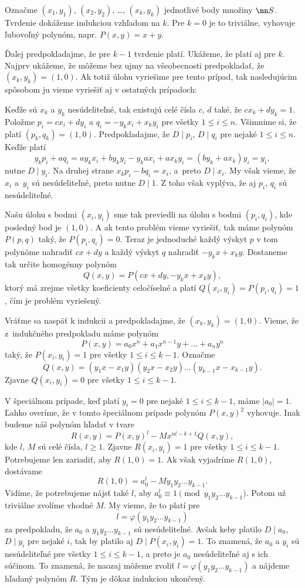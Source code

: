 {%
Označme $(x_1,y_1)$, $(x_2,y_2)$, \dots, $(x_k,y_k)$ jednotlivé body množiny $\mn S$. Tvrdenie dokážeme indukciou vzhľadom na $k$. Pre $k=0$ je to triviálne, vyhovuje ľubovoľný polynóm, napr. $P(x,y)=x+y$.

Ďalej predpokladajme, že pre $k-1$ tvrdenie platí. Ukážeme, že platí aj pre $k$. Najprv ukážeme, že môžeme bez ujmy na všeobecnosti predpokladať, že $(x_k,y_k)=(1,0)$. Ak totiž úlohu vyriešime pre tento prípad, tak nasledujúcim spôsobom ju vieme vyriešiť aj v ostatných prípadoch:

Keďže sú $x_k$ a $y_k$ nesúdeliteľné, tak existujú celé čísla $c$, $d$ také, že $cx_k+dy_k=1$. Položme $p_i=cx_i+dy_i$ a $q_i=-y_kx_i+x_ky_i$ pre všetky $1\le i\le n$. Všimnime si, že platí $(p_k,q_k)=(1,0)$. Predpokladajme, že $D\mid p_i$, $D\mid q_i$ pre nejaké $1\le i\le n$. Keďže platí
$$
y_kp_i+aq_i=ay_kx_i+by_ky_i-y_kax_i+ax_ky_i=(by_k+ax_k)y_i=y_i,
$$
nutne $D\mid y_i$. Na druhej strane $x_kp_i-bq_i=x_i$, a~preto $D\mid x_i$. My však vieme, že $x_i$ a~$y_i$ sú nesúdeliteľné, preto nutne $D\mid 1$. Z toho však vyplýva, že aj $p_i$, $q_i$ sú nesúdeliteľné.

Našu úlohu s bodmi $(x_i,y_i)$ sme tak previedli na úlohu s bodmi $(p_i,q_i)$, kde posledný bod je $(1,0)$. A ak tento problém vieme vyriešiť, tak máme polynóm $P(p,q)$ taký, že $P(p_i,q_i)=0$. Teraz je jednoduché každý výskyt $p$ v tom polynóme nahradiť $cx+dy$ a každý výskyt $q$ nahradiť $-y_kx+x_ky$. Dostaneme tak určite homogénny polynóm $$Q(x,y)=P(cx+dy,-y_kx+x_ky),$$ ktorý má zrejme všetky koeficienty celočíselné a platí $Q(x_i,y_i)=P(p_i,q_i)=1$, čím je problém vyriešený.

Vráťme sa naspäť k indukcii a predpokladajme, že $(x_k,y_k)=(1,0)$.
Vieme, že z~indukčného predpokladu máme polynóm $$P(x,y)=a_0x^n+a_1x^{n-1}y+\dots+a_ny^n$$ taký, že $P(x_i,y_i)=1$ pre všetky $1\le i\le k-1$. Označme $$Q(x,y)=(y_1x-x_1y)(y_2x-x_2y)\dots(y_{k-1}x-x_{k-1}y).$$ Zjavne $Q(x_i,y_i)=0$ pre všetky $1\le i\le k-1$.

V špeciálnom prípade, keď platí $y_i=0$ pre nejaké $1\le i\le k-1$, máme $|a_0|=1$. Ľahko overíme, že v tomto špeciálnom prípade polynóm $P(x,y)^2$ vyhovuje. Inak budeme náš polynóm hľadať v tvare $$R(x,y)=P(x,y)^l-Mx^{nl-k+1}Q(x,y),$$ kde $l$, $M$ sú celé čísla, $l\ge 1$. Zjavne $R(x_i,y_i)=1$ pre všetky $1\le i\le k-1$. Potrebujeme len zariadiť, aby $R(1,0)=1$. Ak však vyjadríme $R(1,0)$, dostávame $$R(1,0)=a_0^l-My_1y_2\dots y_{k-1}.$$
Vidíme, že potrebujeme nájsť také $l$, aby $a_0^l\equiv 1\pmod{y_1y_2\dots y_{k-1}}$. Potom už triviálne zvolíme vhodné $M$. My vieme, že to platí pre $$l=\varphi(y_1y_2\dots y_{k-1})$$ za predpokladu, že $a_0$ a $y_1y_2\dots y_{k-1}$ sú nesúdeliteľné. Avšak keby platilo $D\mid a_0$, $D\mid y_i$ pre nejaké $i$, tak by platilo aj $D\mid P(x_i,y_i)=1$. To znamená, že $a_0$ a $y_i$ sú nesúdeliteľné pre všetky $1\le i\le k-1$, a preto je $a_0$ nesúdeliteľné aj s ich súčinom. To znamená, že naozaj môžeme zvoliť $l=\varphi(y_1y_2\dots y_{k-1})$ a nájdeme hľadaný polynóm $R$. Tým je dôkaz indukciou ukončený.
}

